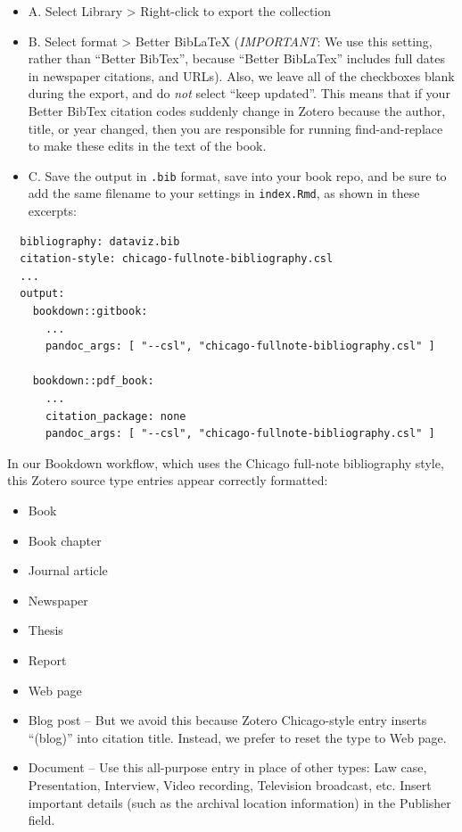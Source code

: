 \documentclass[
  english,
]{book}
\providecommand{\tightlist}{%
  \setlength{\itemsep}{0pt}\setlength{\parskip}{0pt}}
\begin{document}
\begin{itemize}
\tightlist
\item
  A. Select Library \textgreater{} Right-click to export the collection
\item
  B. Select format \textgreater{} Better BibLaTeX (\emph{IMPORTANT}: We use this setting, rather than ``Better BibTex'', because ``Better BibLaTex'' includes full dates in newspaper citations, and URLs). Also, we leave all of the checkboxes blank during the export, and do \emph{not} select ``keep updated''. This means that if your Better BibTex citation codes suddenly change in Zotero because the author, title, or year changed, then you are responsible for running find-and-replace to make these edits in the text of the book.
\item
  C. Save the output in \texttt{.bib} format, save into your book repo, and be sure to add the same filename to your settings in \texttt{index.Rmd}, as shown in these excerpts:
\end{itemize}

\begin{verbatim}
  bibliography: dataviz.bib
  citation-style: chicago-fullnote-bibliography.csl
  ...
  output:
    bookdown::gitbook:
      ...
      pandoc_args: [ "--csl", "chicago-fullnote-bibliography.csl" ]

    bookdown::pdf_book:
      ...
      citation_package: none
      pandoc_args: [ "--csl", "chicago-fullnote-bibliography.csl" ]
\end{verbatim}

In our Bookdown workflow, which uses the Chicago full-note bibliography style, this Zotero source type entries appear correctly formatted:

\begin{itemize}
\tightlist
\item
  Book
\item
  Book chapter
\item
  Journal article
\item
  Newspaper
\item
  Thesis
\item
  Report
\item
  Web page
\item
  Blog post -- But we avoid this because Zotero Chicago-style entry inserts ``(blog)'' into citation title. Instead, we prefer to reset the type to Web page.
\item
  Document -- Use this all-purpose entry in place of other types: Law case, Presentation, Interview, Video recording, Television broadcast, etc. Insert important details (such as the archival location information) in the Publisher field.
\end{itemize}
\end{document}
